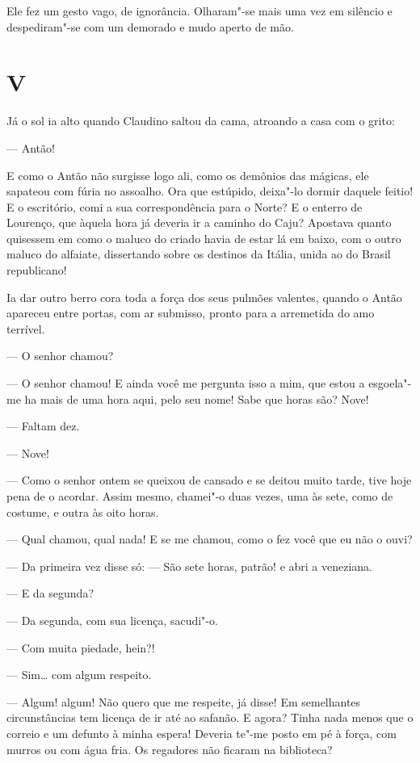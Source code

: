 Ele fez um gesto vago, de ignorância. Olharam"-se mais uma vez em
silêncio e despediram"-se com um demorado e mudo aperto de mão.

\section{V}

Já o sol ia alto quando Claudino saltou da cama, atroando a casa com o
grito:

--- Antão!

E como o Antão não surgisse logo ali, como os demônios das mágicas, ele
sapateou com fúria no assoalho. Ora que estúpido, deixa"-lo dormir
daquele feitio! E o escritório, comi a sua correspondência para o Norte?
E o enterro de Lourenço, que àquela hora já deveria ir a caminho do
Caju? Apostava quanto quisessem em como o maluco do criado havia de
estar lá em baixo, com o outro maluco do alfaiate, dissertando sobre os
destinos da Itália, unida ao do Brasil republicano!

Ia dar outro berro cora toda a força dos seus pulmões valentes, quando o
Antão apareceu entre portas, com ar submisso, pronto para a arremetida
do amo terrível.

--- O senhor chamou?

--- O senhor chamou! E ainda você me pergunta isso a mim, que estou a
esgoela"-me ha mais de uma hora aqui, pelo seu nome! Sabe que horas são?
Nove!

--- Faltam dez.

--- Nove!

--- Como o senhor ontem se queixou de cansado e se deitou muito tarde,
tive hoje pena de o acordar. Assim mesmo, chamei"-o duas vezes, uma às
sete, como de costume, e outra às oito horas.

--- Qual chamou, qual nada! E se me chamou, como o fez você que eu não o
ouvi?

--- Da primeira vez disse só: --- São sete horas, patrão! e abri a
veneziana.

--- E da segunda?

--- Da segunda, com sua licença, sacudi"-o.

--- Com muita piedade, hein?!

--- Sim\ldots{} com algum respeito.

--- Algum! algum! Não quero que me respeite, já disse! Em semelhantes
circunstâncias tem licença de ir até ao safanão. E agora? Tinha nada
menos que o correio e um defunto à minha espera! Deveria te"-me posto em
pé à força, com murros ou com água fria. Os regadores não ficaram na
biblioteca?

